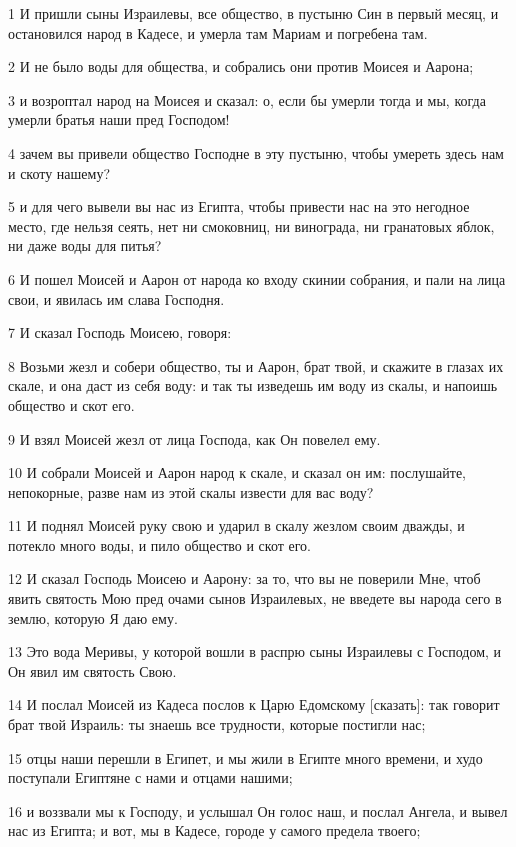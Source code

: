 \par 1 И пришли сыны Израилевы, все общество, в пустыню Син в первый месяц, и остановился народ в Кадесе, и умерла там Мариам и погребена там.
\par 2 И не было воды для общества, и собрались они против Моисея и Аарона;
\par 3 и возроптал народ на Моисея и сказал: о, если бы умерли тогда и мы, когда умерли братья наши пред Господом!
\par 4 зачем вы привели общество Господне в эту пустыню, чтобы умереть здесь нам и скоту нашему?
\par 5 и для чего вывели вы нас из Египта, чтобы привести нас на это негодное место, где нельзя сеять, нет ни смоковниц, ни винограда, ни гранатовых яблок, ни даже воды для питья?
\par 6 И пошел Моисей и Аарон от народа ко входу скинии собрания, и пали на лица свои, и явилась им слава Господня.
\par 7 И сказал Господь Моисею, говоря:
\par 8 Возьми жезл и собери общество, ты и Аарон, брат твой, и скажите в глазах их скале, и она даст из себя воду: и так ты изведешь им воду из скалы, и напоишь общество и скот его.
\par 9 И взял Моисей жезл от лица Господа, как Он повелел ему.
\par 10 И собрали Моисей и Аарон народ к скале, и сказал он им: послушайте, непокорные, разве нам из этой скалы извести для вас воду?
\par 11 И поднял Моисей руку свою и ударил в скалу жезлом своим дважды, и потекло много воды, и пило общество и скот его.
\par 12 И сказал Господь Моисею и Аарону: за то, что вы не поверили Мне, чтоб явить святость Мою пред очами сынов Израилевых, не введете вы народа сего в землю, которую Я даю ему.
\par 13 Это вода Меривы, у которой вошли в распрю сыны Израилевы с Господом, и Он явил им святость Свою.
\par 14 И послал Моисей из Кадеса послов к Царю Едомскому [сказать]: так говорит брат твой Израиль: ты знаешь все трудности, которые постигли нас;
\par 15 отцы наши перешли в Египет, и мы жили в Египте много времени, и худо поступали Египтяне с нами и отцами нашими;
\par 16 и воззвали мы к Господу, и услышал Он голос наш, и послал Ангела, и вывел нас из Египта; и вот, мы в Кадесе, городе у самого предела твоего;
